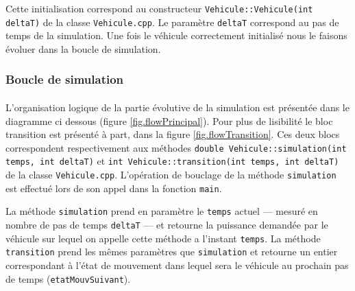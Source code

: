 			Cette initialisation correspond au constructeur \texttt{Vehicule::Vehicule(int deltaT)} de la classe \texttt{Vehicule.cpp}. Le paramètre \texttt{deltaT} correspond au pas de temps de la simulation. Une fois le véhicule correctement initialisé nous le faisons évoluer dans la boucle de simulation.
	
		\subsubsection{Boucle de simulation \label{sec.descrSimulation}}
			
			\paragraph{}L'organisation logique de la partie évolutive de la simulation est présentée dans le diagramme ci dessous (figure \ref{fig.flowPrincipal}). Pour plus de lisibilité le bloc transition est présenté à part, dans la figure \ref{fig.flowTransition}. Ces deux blocs correspondent respectivement aux méthodes \texttt{double Vehicule::simulation(int temps, int deltaT)} et \texttt{int Vehicule::transition(int temps, int deltaT)} de la classe \texttt{Vehicule.cpp}. L'opération de bouclage de la méthode \texttt{simulation} est effectué lors de son appel dans la fonction \texttt{main}.
			
			La méthode \texttt{simulation} prend en paramètre le \texttt{temps} actuel --- mesuré en nombre de pas de temps \texttt{deltaT} --- et retourne la puissance demandée par le véhicule sur lequel on appelle cette méthode a l'instant \texttt{temps}.
			La méthode \texttt{transition} prend les mêmes paramètres que \texttt{simulation} et retourne un entier correspondant à l'état de mouvement dans lequel sera le véhicule au prochain pas de temps (\texttt{etatMouvSuivant}).
			
